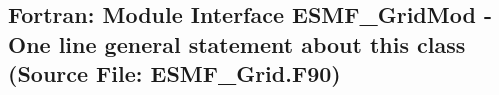  
\parskip        0pt
\parindent      0pt
\baselineskip  11pt
 
\def\bv{\begin{verbatim}}
\def\ev{\end{verbatim}}
\def\be{\begin{equation}}
\def\ee{\end{equation}}
\def\bea{\begin{eqnarray}}
\def\eea{\end{eqnarray}}
\def\bi{\begin{itemize}}
\def\ei{\end{itemize}}
\def\bn{\begin{enumerate}}
\def\en{\end{enumerate}}
\def\bd{\begin{description}}
\def\ed{\end{description}}
\def\({\left (}
\def\){\right )}
\def\[{\left [}
\def\]{\right ]}
\def\<{\left  \langle}
\def\>{\right \rangle}
\def\cI{{\cal I}}
\def\diag{\mathop{\rm diag}}
\def\tr{\mathop{\rm tr}}


 
\subsection{Fortran:  Module Interface ESMF\_GridMod - One line general statement about this class (Source File: ESMF\_Grid.F90)}


  
  
